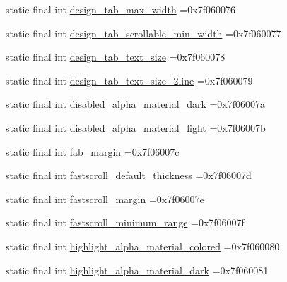 \begin{DoxyCompactItemize}
\item 
static final int \mbox{\hyperlink{classbr_1_1unb_1_1cic_1_1mp_1_1marketmaster_1_1R_1_1dimen_a990f2aa38c150d77e1a2bec75f4ffe46}{design\+\_\+tab\+\_\+max\+\_\+width}} =0x7f060076
\item 
static final int \mbox{\hyperlink{classbr_1_1unb_1_1cic_1_1mp_1_1marketmaster_1_1R_1_1dimen_a515d49d2da0a6c194d3d43ec00283653}{design\+\_\+tab\+\_\+scrollable\+\_\+min\+\_\+width}} =0x7f060077
\item 
static final int \mbox{\hyperlink{classbr_1_1unb_1_1cic_1_1mp_1_1marketmaster_1_1R_1_1dimen_a92b50efe68c8fe557fa85c8cb5845a05}{design\+\_\+tab\+\_\+text\+\_\+size}} =0x7f060078
\item 
static final int \mbox{\hyperlink{classbr_1_1unb_1_1cic_1_1mp_1_1marketmaster_1_1R_1_1dimen_a843e8cce8580e7d1ef22bd9ab0231568}{design\+\_\+tab\+\_\+text\+\_\+size\+\_\+2line}} =0x7f060079
\item 
static final int \mbox{\hyperlink{classbr_1_1unb_1_1cic_1_1mp_1_1marketmaster_1_1R_1_1dimen_a38bbed910604638a1e2d497de391dfc5}{disabled\+\_\+alpha\+\_\+material\+\_\+dark}} =0x7f06007a
\item 
static final int \mbox{\hyperlink{classbr_1_1unb_1_1cic_1_1mp_1_1marketmaster_1_1R_1_1dimen_a9a46369f52446df386ddaf2deca057f2}{disabled\+\_\+alpha\+\_\+material\+\_\+light}} =0x7f06007b
\item 
static final int \mbox{\hyperlink{classbr_1_1unb_1_1cic_1_1mp_1_1marketmaster_1_1R_1_1dimen_ab3362064da13e4d9777736581f452b45}{fab\+\_\+margin}} =0x7f06007c
\item 
static final int \mbox{\hyperlink{classbr_1_1unb_1_1cic_1_1mp_1_1marketmaster_1_1R_1_1dimen_a5921978eb569b16d6154e33603aa6f33}{fastscroll\+\_\+default\+\_\+thickness}} =0x7f06007d
\item 
static final int \mbox{\hyperlink{classbr_1_1unb_1_1cic_1_1mp_1_1marketmaster_1_1R_1_1dimen_a2ddef9c3590f2213ca1f21503013a5e2}{fastscroll\+\_\+margin}} =0x7f06007e
\item 
static final int \mbox{\hyperlink{classbr_1_1unb_1_1cic_1_1mp_1_1marketmaster_1_1R_1_1dimen_a6a0dc0a78d2bd4314b0ef5e27a900a3a}{fastscroll\+\_\+minimum\+\_\+range}} =0x7f06007f
\item 
static final int \mbox{\hyperlink{classbr_1_1unb_1_1cic_1_1mp_1_1marketmaster_1_1R_1_1dimen_a9596b102ce8438b8f09e4e3bc472c1a1}{highlight\+\_\+alpha\+\_\+material\+\_\+colored}} =0x7f060080
\item 
static final int \mbox{\hyperlink{classbr_1_1unb_1_1cic_1_1mp_1_1marketmaster_1_1R_1_1dimen_ab2ecd8f26d282ec249aabdaa2fc44cb5}{highlight\+\_\+alpha\+\_\+material\+\_\+dark}} =0x7f060081

\end{DoxyCompactItemize}
